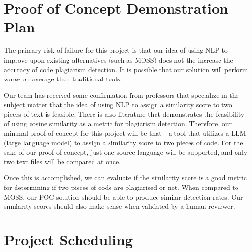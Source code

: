 \documentclass{article}
\begin{document}
\section{Proof of Concept Demonstration Plan}


The primary risk of failure for this project is that our idea of using NLP to improve upon existing alternatives (such as MOSS) does not the increase the accuracy of code plagiarism detection. It is possible that our solution will perform worse on average than traditional tools.

Our team has received some confirmation from professors that specialize in the subject matter that the idea of using NLP to assign a similarity score to two pieces of text is feasible. There is also literature that demonstrates the feasibility of using cosine similarity as a metric for plagiarism detection. Therefore, our minimal proof of concept for this project will be that - a tool that utilizes a LLM (large language model) to assign a similarity score to two pieces of code. For the sake of our proof of concept, just one source language will be supported, and only two text files will be compared at once.

Once this is accomplished, we can evaluate if the similarity score is a good metric for determining if two pieces of code are plagiarised or not. When compared to MOSS, our POC solution should be able to produce similar detection rates. Our similarity scores should also make sense when validated by a human reviewer.



\section{Project Scheduling}

\end{document}
